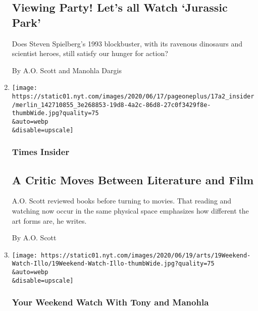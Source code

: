 \begin{enumerate}
  \hypertarget{viewing-party-lets-all-watch-jurassic-park}{%
  \subsection{Viewing Party! Let's all Watch `Jurassic
  Park'}\label{viewing-party-lets-all-watch-jurassic-park}}

  Does Steven Spielberg's 1993 blockbuster, with its ravenous dinosaurs
  and scientist heroes, still satisfy our hunger for action?

  By A.O. Scott and Manohla Dargis
\item
  \href{/2020/06/17/insider/a-critic-moves-between-literature-and-film.html}{}

  \texttt{[image: https://static01.nyt.com/images/2020/06/17/pageoneplus/17a2\_insider/merlin\_142710855\_3e268853-19d8-4a2c-86d8-27c0f3429f8e-thumbWide.jpg?quality=75\\\&auto=webp\\\&disable=upscale]}

  \hypertarget{times-insider}{%
  \subsubsection{Times Insider}\label{times-insider}}

  \hypertarget{a-critic-moves-between-literature-and-film}{%
  \subsection{A Critic Moves Between Literature and
  Film}\label{a-critic-moves-between-literature-and-film}}

  A.O. Scott reviewed books before turning to movies. That reading and
  watching now occur in the same physical space emphasizes how different
  the art forms are, he writes.

  By A.O. Scott
\item
  \href{/2020/06/16/movies/nine-to-five-viewers.html}{}

  \texttt{[image: https://static01.nyt.com/images/2020/06/19/arts/19Weekend-Watch-Illo/19Weekend-Watch-Illo-thumbWide.jpg?quality=75\\\&auto=webp\\\&disable=upscale]}

  \hypertarget{your-weekend-watch-with-tony-and-manohla-1}{%
  \subsubsection{Your Weekend Watch With Tony and
  Manohla}\label{your-weekend-watch-with-tony-and-manohla-1}}


\end{enumerate}
